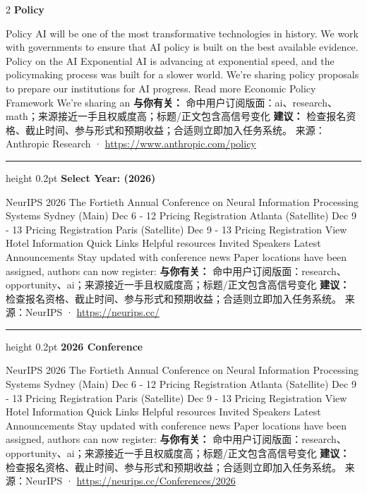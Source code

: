 \documentclass[10.5pt]{ctexart}
\begin{document}
\begin{multicols}{2}
{\large\bfseries Policy}\par
Policy AI will be one of the most transformative technologies in history. We work with governments to ensure that AI policy is built on the best available evidence. Policy on the AI Exponential AI is advancing at exponential speed, and the policymaking process was built for a slower world. We’re sharing policy proposals to prepare our institutions for AI progress. Read more Economic Policy Framework We’re sharing an 
\textbf{与你有关：} 命中用户订阅版面：ai、research、math；来源接近一手且权威度高；标题/正文包含高信号变化
\textbf{建议：} 检查报名资格、截止时间、参与形式和预期收益；合适则立即加入任务系统。
{\footnotesize\color{ormuted} 来源：Anthropic Research · \url{https://www.anthropic.com/policy}}
\vspace{2mm}
\hrule height 0.2pt
\vspace{2mm}
{\large\bfseries Select Year: (2026)}\par
NeurIPS 2026 The Fortieth Annual Conference on Neural Information Processing Systems Sydney (Main) Dec 6 - 12 Pricing Registration Atlanta (Satellite) Dec 9 - 13 Pricing Registration Paris (Satellite) Dec 9 - 13 Pricing Registration View Hotel Information Quick Links Helpful resources Invited Speakers Latest Announcements Stay updated with conference news Paper locations have been assigned, authors can now register: 
\textbf{与你有关：} 命中用户订阅版面：research、opportunity、ai；来源接近一手且权威度高；标题/正文包含高信号变化
\textbf{建议：} 检查报名资格、截止时间、参与形式和预期收益；合适则立即加入任务系统。
{\footnotesize\color{ormuted} 来源：NeurIPS · \url{https://neurips.cc/}}
\vspace{2mm}
\hrule height 0.2pt
\vspace{2mm}
{\large\bfseries 2026 Conference}\par
NeurIPS 2026 The Fortieth Annual Conference on Neural Information Processing Systems Sydney (Main) Dec 6 - 12 Pricing Registration Atlanta (Satellite) Dec 9 - 13 Pricing Registration Paris (Satellite) Dec 9 - 13 Pricing Registration View Hotel Information Quick Links Helpful resources Invited Speakers Latest Announcements Stay updated with conference news Paper locations have been assigned, authors can now register: 
\textbf{与你有关：} 命中用户订阅版面：research、opportunity、ai；来源接近一手且权威度高；标题/正文包含高信号变化
\textbf{建议：} 检查报名资格、截止时间、参与形式和预期收益；合适则立即加入任务系统。
{\footnotesize\color{ormuted} 来源：NeurIPS · \url{https://neurips.cc/Conferences/2026}}

\end{multicols}
\end{document}

